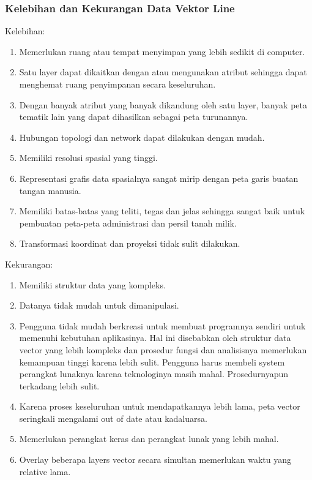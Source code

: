  \subsubsection{Kelebihan dan Kekurangan Data Vektor Line}
 Kelebihan:
 \begin{enumerate}
    \item Memerlukan ruang atau tempat menyimpan yang lebih sedikit di computer.
    \item Satu layer dapat dikaitkan dengan atau mengunakan atribut sehingga dapat menghemat ruang penyimpanan secara keseluruhan.
    \item Dengan banyak atribut yang banyak dikandung oleh satu layer, 
             banyak peta tematik lain yang dapat dihasilkan sebagai peta turunannya.
    \item Hubungan topologi dan network dapat dilakukan dengan mudah.
    \item Memiliki resolusi spasial yang tinggi.
    \item Representasi grafis data spasialnya sangat mirip dengan peta garis buatan tangan manusia.
    \item Memiliki batas-batas yang teliti, tegas dan jelas sehingga sangat baik untuk 
    pembuatan peta-peta administrasi dan persil tanah milik.
    \item Transformasi koordinat dan proyeksi tidak sulit dilakukan. 
 \end{enumerate}
 Kekurangan:
 \begin{enumerate}
    \item Memiliki struktur data yang kompleks.
    \item Datanya tidak mudah untuk dimanipulasi.
    \item Pengguna tidak mudah berkreasi untuk membuat programnya sendiri untuk memenuhi kebutuhan aplikasinya. 
             Hal ini disebabkan oleh struktur data vector yang lebih kompleks dan prosedur fungsi dan analisisnya 
             memerlukan kemampuan tinggi karena lebih sulit. 
            Pengguna harus membeli system perangkat lunaknya karena teknologinya masih mahal. Prosedurnyapun terkadang lebih sulit.
    \item Karena proses keseluruhan untuk mendapatkannya lebih lama, peta vector seringkali mengalami out of date atau kadaluarsa.
    \item Memerlukan perangkat keras dan perangkat lunak yang lebih mahal.
    \item Overlay beberapa layers vector secara simultan memerlukan waktu yang relative lama.
 \end{enumerate}
 
